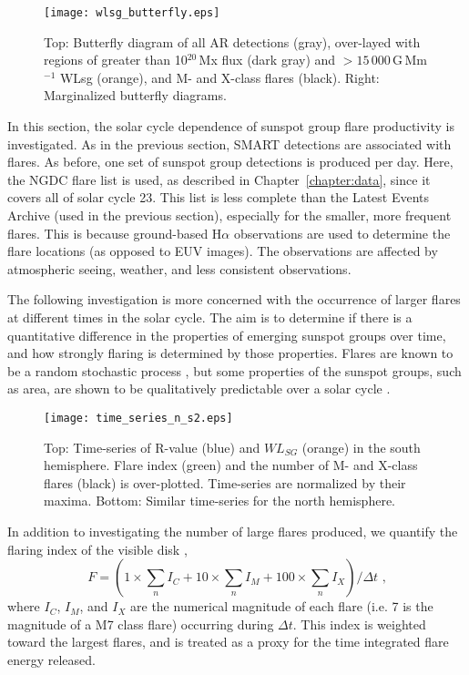 {%
\begin{figure}[!t]
\centerline{\texttt{[image: wlsg\_butterfly.eps]}}
\caption[AR butterfly diagram showing PSL strength.]{Top: Butterfly diagram of all AR detections (gray), over-layed
with regions of greater than 10$^{20}$\,Mx flux (dark gray) and  $>15\,000$\,G\,Mm$^{-1}$ WLsg (orange),
and M- and X-class flares (black). Right: Marginalized butterfly diagrams.}
\label{fig:flarebutterfly}
\end{figure}

In this section, the solar cycle dependence of sunspot group flare productivity is investigated. As in the previous section, \gls{SMART} detections are associated with flares. As before, one set of sunspot group detections is produced per day. Here, the \gls{NGDC} flare list is used, as described in Chapter~\ref{chapter:data}, since it covers all of solar cycle 23. This list is less complete than the Latest Events Archive (used in the previous section), especially for the smaller, more frequent flares. This is because ground-based H$\alpha$ observations are used to determine the flare locations (as opposed to \gls{EUV} images). The observations are affected by atmospheric seeing, weather, and less consistent observations. 

The following investigation is more concerned with the occurrence of larger flares at different times in the solar cycle. The aim is to determine if there is a quantitative difference in the properties of emerging sunspot groups over time, and how strongly flaring is determined by those properties. Flares are known to be a random stochastic process \citep{Wheatland:2002}, but some properties of the sunspot groups, such as area, are shown to be qualitatively predictable over a solar cycle \citep{Hathaway:2009}. 

\begin{figure}[!t]
\centerline{\texttt{[image: time\_series\_n\_s2.eps]}}
\caption[Sun-averaged AR property time series.]{Top: Time-series of R-value (blue) and $WL_{SG}$ (orange) in the south hemisphere. Flare index (green) and the number of M- and X-class flares (black) is over-plotted. Time-series are normalized by their maxima. Bottom: Similar time-series for the north hemisphere.}
\label{fig:flrcmplxtsers}
\end{figure}

In addition to investigating the number of large flares produced, we quantify the flaring index of the visible disk \citep{Antalova:1996},
\begin{equation}
F = (1 \times \sum_n I_C + 10 \times \sum_n I_M + 100 \times \sum_n I_X )/\Delta t \mbox{ ,}
\end{equation}
where $I_C$, $I_M$, and $I_X$ are the numerical magnitude of each flare (i.e. 7 is the magnitude of a M7 class flare) occurring during $\Delta t$. This index is weighted toward the largest flares, and is treated as a proxy for the time integrated flare energy released.

}
